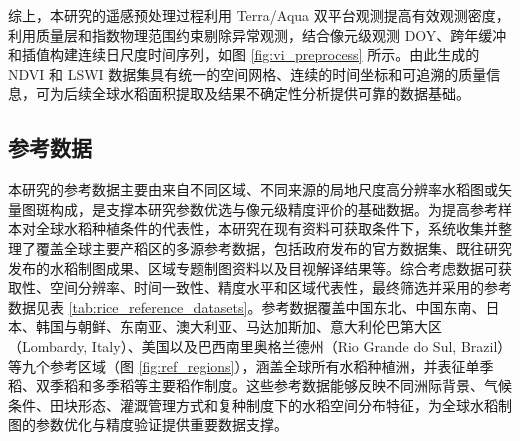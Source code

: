 综上，本研究的遥感预处理过程利用 Terra/Aqua 双平台观测提高有效观测密度，利用质量层和指数物理范围约束剔除异常观测，结合像元级观测 DOY、跨年缓冲和插值构建连续日尺度时间序列，如图 \ref{fig:vi_preprocess} 所示。由此生成的 NDVI 和 LSWI 数据集具有统一的空间网格、连续的时间坐标和可追溯的质量信息，可为后续全球水稻面积提取及结果不确定性分析提供可靠的数据基础。

\subsection{参考数据}
\label{sec:ref_data}

本研究的参考数据主要由来自不同区域、不同来源的局地尺度高分辨率水稻图或矢量图斑构成，是支撑本研究参数优选与像元级精度评价的基础数据。为提高参考样本对全球水稻种植条件的代表性，本研究在现有资料可获取条件下，系统收集并整理了覆盖全球主要产稻区的多源参考数据，包括政府发布的官方数据集、既往研究发布的水稻制图成果、区域专题制图资料以及目视解译结果等。综合考虑数据可获取性、空间分辨率、时间一致性、精度水平和区域代表性，最终筛选并采用的参考数据见表 \ref{tab:rice_reference_datasets}。参考数据覆盖中国东北、中国东南、日本、韩国与朝鲜、东南亚、澳大利亚、马达加斯加、意大利伦巴第大区（Lombardy, Italy）、美国以及巴西南里奥格兰德州（Rio Grande do Sul, Brazil）等九个参考区域（图 \ref{fig:ref_regions}），涵盖全球所有水稻种植洲，并表征单季稻、双季稻和多季稻等主要稻作制度。这些参考数据能够反映不同洲际背景、气候条件、田块形态、灌溉管理方式和复种制度下的水稻空间分布特征，为全球水稻制图的参数优化与精度验证提供重要数据支撑。



